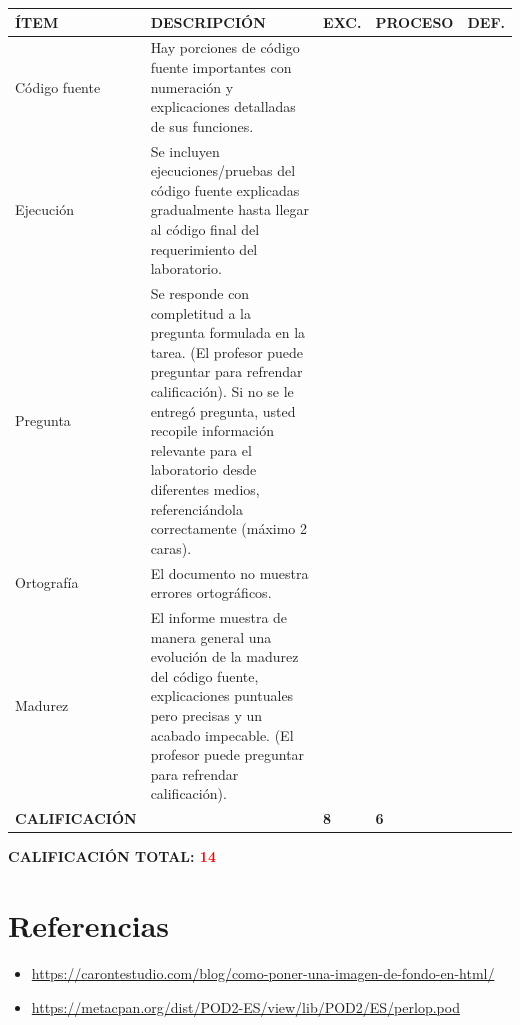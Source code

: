 \documentclass{article}
\begin{document}
           \begin{center}
        \begin{table}[h!]
        \renewcommand{\arraystretch}{2}
        \begin{tabular}{|>{\centering\arraybackslash}m{3cm}|>{\arraybackslash}m{7cm}|>{\centering\arraybackslash}m{1cm}|>{\centering\arraybackslash}m{2cm}|>{\centering\arraybackslash}m{1cm}|}
        \hline
        \rowcolor[HTML]{D9EAD3} 
        \textbf{ÍTEM}      & \textbf{DESCRIPCIÓN} & \textbf{EXC.} & \textbf{PROCESO} & \textbf{DEF.} \\ \hline
        Código fuente      & Hay porciones de código fuente importantes con numeración y explicaciones detalladas de sus funciones. & 4 &  & \\ \hline
        Ejecución          & Se incluyen ejecuciones/pruebas del código fuente explicadas gradualmente hasta llegar al código final del requerimiento del laboratorio. & 4 &  &  \\ \hline
        Pregunta           & Se responde con completitud a la pregunta formulada en la tarea. (El profesor puede preguntar para refrendar calificación). Si no se le entregó pregunta, usted recopile información relevante para el laboratorio desde diferentes medios, referenciándola correctamente (máximo 2 caras). &  & 2 &  \\ \hline
        Ortografía         & El documento no muestra errores ortográficos. &  & 2 &  \\ \hline
        Madurez            & El informe muestra de manera general una evolución de la madurez del código fuente, explicaciones puntuales pero precisas y un acabado impecable. (El profesor puede preguntar para refrendar calificación). &  & 2 &  \\ \hline
        \rowcolor[HTML]{F4CCCC} 
        \textbf{CALIFICACIÓN} & & \textbf{8} & \textbf{6} & \textbf{} \\ \hline
        \end{tabular}
        \end{table}
        \end{center}

       \vspace{0.3cm}
    
            \textbf{\Large CALIFICACIÓN TOTAL: \textcolor{red}{14}} 
        
        \section{Referencias}
        \begin{itemize}			
        	\item \url{https://carontestudio.com/blog/como-poner-una-imagen-de-fondo-en-html/}
        	\item \url{https://metacpan.org/dist/POD2-ES/view/lib/POD2/ES/perlop.pod}
        \end{itemize}	
     
\end{document}
